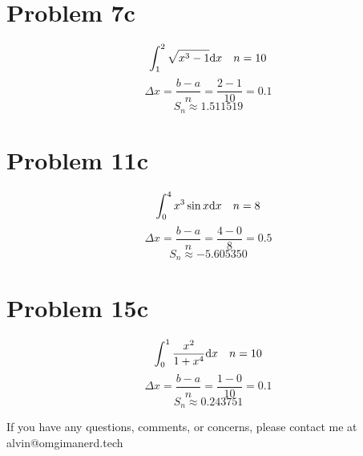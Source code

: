 \documentclass[letterpaper, 12pt]{math}
\begin{document}
\section*{Problem 7c}
\[ \int_{1}^{2}{\sqrt{x^{3}-1}\mathrm{d}{x}} \quad n = 10 \]
\[ \Delta x = \frac{b-a}{n} = \frac{2-1}{10} = 0.1 \]
\[ S_{n} \approx 1.511519 \]

\section*{Problem 11c}
\[ \int_{0}^{4}{x^{3}\sin{x}\mathrm{d}{x}} \quad n = 8 \]
\[ \Delta x = \frac{b-a}{n} = \frac{4-0}{8} = 0.5 \]
\[ S_{n} \approx -5.605350 \]

\section*{Problem 15c}
\[ \int_{0}^{1}{\frac{x^{2}}{1+x^{4}}\mathrm{d}{x}} \quad n = 10 \]
\[ \Delta x = \frac{b-a}{n} = \frac{1-0}{10} = 0.1 \]
\[ S_{n} \approx 0.243751 \]

\begin{center}
  If you have any questions, comments, or concerns, please contact me at
  alvin@omgimanerd.tech
\end{center}
\end{document}
